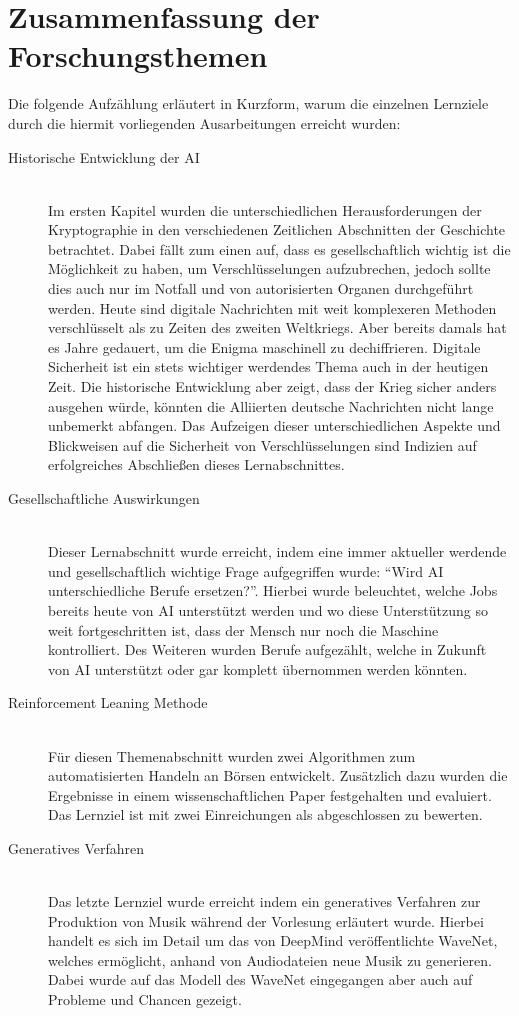 \chapter{Zusammenfassung der Forschungsthemen}
\nocite{*}

Die folgende Aufzählung erläutert in Kurzform, warum die einzelnen Lernziele durch die hiermit vorliegenden Ausarbeitungen erreicht wurden:

\begin{description}
	\item [Historische Entwicklung der \ac{AI}]\hfill \\
	Im ersten Kapitel wurden die unterschiedlichen Herausforderungen der Kryptographie in den verschiedenen Zeitlichen Abschnitten der Geschichte betrachtet. Dabei fällt zum einen auf, dass es gesellschaftlich wichtig ist die Möglichkeit zu haben, um Verschlüsselungen aufzubrechen, jedoch sollte dies auch nur im Notfall und von autorisierten Organen durchgeführt werden. Heute sind digitale Nachrichten mit weit komplexeren Methoden verschlüsselt als zu Zeiten des zweiten Weltkriegs. Aber bereits damals hat es Jahre gedauert, um die Enigma maschinell zu dechiffrieren. Digitale Sicherheit ist ein stets wichtiger werdendes Thema auch in der heutigen Zeit. Die historische Entwicklung aber zeigt, dass der Krieg sicher anders ausgehen würde, könnten die Alliierten deutsche Nachrichten nicht lange unbemerkt abfangen.
	Das Aufzeigen dieser unterschiedlichen Aspekte und Blickweisen auf die Sicherheit von Verschlüsselungen sind Indizien auf erfolgreiches Abschließen dieses Lernabschnittes.
	
	\item [Gesellschaftliche Auswirkungen]\hfill \\
	Dieser Lernabschnitt wurde erreicht, indem eine immer aktueller werdende und gesellschaftlich wichtige Frage aufgegriffen wurde: \enquote{Wird \ac{AI} unterschiedliche Berufe ersetzen?}. Hierbei wurde beleuchtet, welche Jobs bereits heute von \ac{AI} unterstützt werden und wo diese Unterstützung so weit fortgeschritten ist, dass der Mensch nur noch die Maschine kontrolliert. Des Weiteren wurden Berufe aufgezählt, welche in Zukunft von \ac{AI} unterstützt oder gar komplett übernommen werden könnten.
	
	\item [Reinforcement Leaning Methode]\hfill \\
	Für diesen Themenabschnitt wurden zwei Algorithmen zum automatisierten Handeln an Börsen entwickelt. Zusätzlich dazu wurden die Ergebnisse in einem wissenschaftlichen Paper festgehalten und evaluiert. Das Lernziel ist mit zwei Einreichungen als abgeschlossen zu bewerten.
	
	\item [Generatives Verfahren] \hfill \\
	Das letzte Lernziel wurde erreicht indem ein generatives Verfahren zur Produktion von Musik während der Vorlesung erläutert wurde. Hierbei handelt es sich im Detail um das von DeepMind veröffentlichte WaveNet, welches ermöglicht, anhand von Audiodateien neue Musik zu generieren. Dabei wurde auf das Modell des WaveNet eingegangen aber auch auf Probleme und Chancen gezeigt.
\end{description}